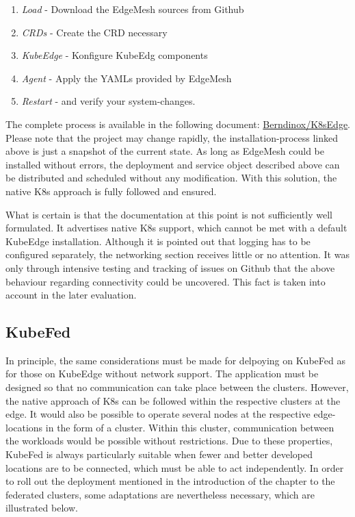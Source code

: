 \documentclass[MSC,Master,english]{twbook}%
\begin{document}
\begin{enumerate}
    \item \textit{Load} - Download the EdgeMesh sources from Github
    \item \textit{CRDs} - Create the \ac{CRD} necessary
    \item \textit{KubeEdge} - Konfigure KubeEdg components
    \item \textit{Agent} - Apply the YAMLs provided by EdgeMesh
    \item \textit{Restart} - and verify your system-changes.
\end{enumerate}

The complete process is available in the following document: \hyperref{https://github.com/Berndinox/K8sEdge/blob/main/DOCs/kubeedge-edgemesh.md}{}{}{Berndinox/K8sEdge}\cite{bk-gh-edgemesh}. Please note that the project may change rapidly, the installation-process linked above is just a snapshot of the current state. As long as EdgeMesh could be installed without errors, the deployment and service object described above can be distributed and scheduled without any modification. With this solution, the native \ac{K8s} approach is fully followed and ensured.\medbreak

What is certain is that the documentation at this point is not sufficiently well formulated. It advertises native \ac{K8s} support, which cannot be met with a default KubeEdge installation. Although it is pointed out that logging has to be configured separately, the networking section receives little or no attention. It was only through intensive testing and tracking of issues on Github that the above behaviour regarding connectivity could be uncovered. This fact is taken into account in the later evaluation.

\subsection{KubeFed} In principle, the same considerations must be made for delpoying on KubeFed as for those on KubeEdge without network support. The application must be designed so that no communication can take place between the clusters. However, the native approach of \ac{K8s} can be followed within the respective clusters at the edge. It would also be possible to operate several nodes at the respective edge-locations in the form of a cluster. Within this cluster, communication between the workloads would be possible without restrictions. Due to these properties, KubeFed is always particularly suitable when fewer and better developed locations are to be connected, which must be able to act independently. In order to roll out the deployment mentioned in the introduction of the chapter to the federated clusters, some adaptations are nevertheless necessary, which are illustrated below. 
\end{document}
